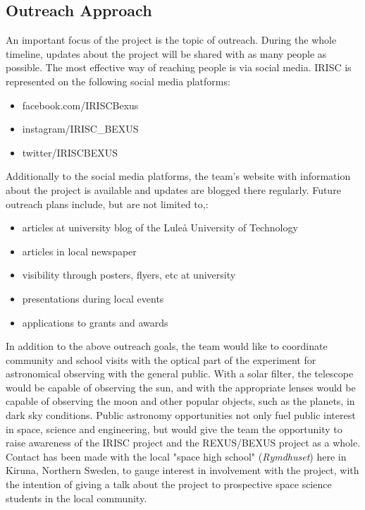 
\subsection{Outreach Approach}
An important focus of the project is the topic of outreach. During the whole timeline, updates about the project will be shared with as many people as possible. The most effective way of reaching people is via social media. IRISC is represented on the following social media platforms:
\begin{itemize}
	\item facebook.com/IRISCBexus
	\item instagram/IRISC\_BEXUS
	\item twitter/IRISCBEXUS
\end{itemize}
Additionally to the social media platforms, the team's website with information about the project is available and updates are blogged there regularly.\newline\newline
Future outreach plans include, but are not limited to,:
\begin{itemize}
	\item articles at university blog of the Lule{\aa} University of Technology
	\item articles in local newspaper
	\item visibility through posters, flyers, etc at university
	\item presentations during local events
	\item applications to grants and awards
\end{itemize}
\newline 
In addition to the above outreach goals, the team would like to coordinate community and school visits with the optical part of the experiment for astronomical observing with the general public. With a solar filter, the telescope would be capable of observing the sun, and with the appropriate lenses would be capable of observing the moon and other popular objects, such as the planets, in dark sky conditions. Public astronomy opportunities not only fuel public interest in space, science and engineering, but would give the team the opportunity to raise awareness of the IRISC project and the REXUS/BEXUS project as a whole.\\
Contact has been made with the local "space high school" (\textit{Rymdhuset}) here in Kiruna, Northern Sweden, to gauge interest in involvement with the project, with the intention of giving a talk about the project to prospective space science students in the local community. 